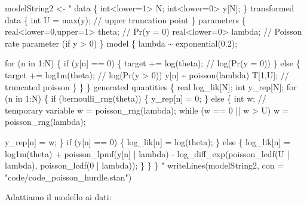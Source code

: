 \documentclass[
  11pt,
  italian,
  a4paper,
  extrafontsizes,onecolumn,openright
  ]{memoir}
\newenvironment{Shaded}{\begin{snugshade}}{\end{snugshade}}
\newcommand{\AttributeTok}[1]{\textcolor[rgb]{0.77,0.63,0.00}{#1}}
\newcommand{\FunctionTok}[1]{\textcolor[rgb]{0.00,0.00,0.00}{#1}}
\newcommand{\NormalTok}[1]{#1}
\newcommand{\OtherTok}[1]{\textcolor[rgb]{0.56,0.35,0.01}{#1}}
\newcommand{\StringTok}[1]{\textcolor[rgb]{0.31,0.60,0.02}{#1}}
\theoremstyle{definition}
\theoremstyle{definition}
\theoremstyle{definition}
\theoremstyle{definition}
\theoremstyle{remark}
\begin{document}
\begin{Shaded}
\begin{Highlighting}[]
\NormalTok{modelString2 }\OtherTok{\textless{}{-}} \StringTok{"}
\StringTok{data \{}
\StringTok{  int\textless{}lower=1\textgreater{} N;}
\StringTok{  int\textless{}lower=0\textgreater{} y[N];}
\StringTok{\}}
\StringTok{transformed data \{}
\StringTok{  int U = max(y);  // upper truncation point}
\StringTok{\}}
\StringTok{parameters \{}
\StringTok{  real\textless{}lower=0,upper=1\textgreater{} theta; // Pr(y = 0)}
\StringTok{  real\textless{}lower=0\textgreater{} lambda; // Poisson rate parameter (if y \textgreater{} 0)}
\StringTok{\}}
\StringTok{model \{}
\StringTok{  lambda \textasciitilde{} exponential(0.2);}

\StringTok{  for (n in 1:N) \{}
\StringTok{    if (y[n] == 0) \{}
\StringTok{      target += log(theta);  // log(Pr(y = 0))}
\StringTok{    \} else \{}
\StringTok{      target += log1m(theta);  // log(Pr(y \textgreater{} 0))}
\StringTok{      y[n] \textasciitilde{} poisson(lambda) T[1,U];  // truncated poisson}
\StringTok{    \}}
\StringTok{  \}}
\StringTok{\}}
\StringTok{generated quantities \{}
\StringTok{  real log\_lik[N];}
\StringTok{  int y\_rep[N];}
\StringTok{  for (n in 1:N) \{}
\StringTok{    if (bernoulli\_rng(theta)) \{}
\StringTok{      y\_rep[n] = 0;}
\StringTok{    \} else \{}
\StringTok{      int w;  // temporary variable}
\StringTok{      w = poisson\_rng(lambda);}
\StringTok{      while (w == 0 || w \textgreater{} U)}
\StringTok{        w = poisson\_rng(lambda);}

\StringTok{      y\_rep[n] = w;}
\StringTok{    \}}
\StringTok{    if (y[n] == 0) \{}
\StringTok{      log\_lik[n] = log(theta);}
\StringTok{    \} else \{}
\StringTok{      log\_lik[n] = log1m(theta)}
\StringTok{    + poisson\_lpmf(y[n] | lambda)}
\StringTok{    {-} log\_diff\_exp(poisson\_lcdf(U | lambda),}
\StringTok{                       poisson\_lcdf(0 | lambda));}
\StringTok{    \}}
\StringTok{  \}}
\StringTok{\}}
\StringTok{"}
\FunctionTok{writeLines}\NormalTok{(modelString2, }\AttributeTok{con =} \StringTok{"code/code\_poisson\_hurdle.stan"}\NormalTok{)}
\end{Highlighting}
\end{Shaded}

\noindent
Adattiamo il modello ai dati:
\end{document}
